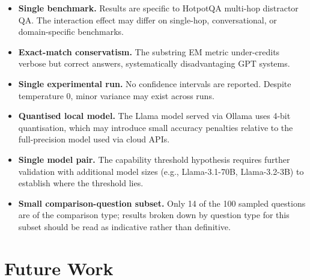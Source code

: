 \documentclass[12pt]{article}
\begin{document}
\begin{itemize}
    \item \textbf{Single benchmark.}  Results are specific to HotpotQA
          multi-hop distractor QA.  The interaction effect may differ on
          single-hop, conversational, or domain-specific benchmarks.
    \item \textbf{Exact-match conservatism.}  The substring EM metric
          under-credits verbose but correct answers, systematically
          disadvantaging GPT systems.
    \item \textbf{Single experimental run.}  No confidence intervals are
          reported.  Despite temperature 0, minor variance may exist across runs.
    \item \textbf{Quantised local model.}  The Llama model served via Ollama
          uses 4-bit quantisation, which may introduce small accuracy penalties
          relative to the full-precision model used via cloud APIs.
    \item \textbf{Single model pair.}  The capability threshold hypothesis
          requires further validation with additional model sizes
          (e.g., Llama-3.1-70B, Llama-3.2-3B) to establish where the
          threshold lies.
    \item \textbf{Small comparison-question subset.}  Only 14 of the 100
          sampled questions are of the comparison type; results broken down
          by question type for this subset should be read as indicative
          rather than definitive.
\end{itemize}

\section{Future Work}
\end{document}
